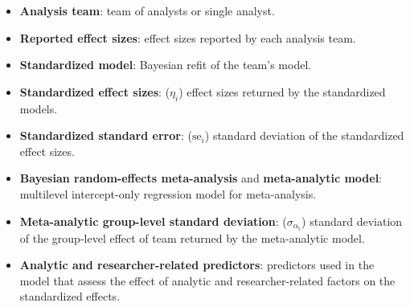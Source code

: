 \documentclass[Review,times,sageh]{sagej}
\providecommand{\tightlist}{\setlength{\itemsep}{0pt}\setlength{\parskip}{0pt}}
\begin{document}
\begin{itemize}
\tightlist
\item
  \textbf{Analysis team}: team of analysts or single analyst.
\item
  \textbf{Reported effect sizes}: effect sizes reported by each analysis team.
\item
  \textbf{Standardized model}: Bayesian refit of the team's model.
\item
  \textbf{Standardized effect sizes}: (\(\eta_i\)) effect sizes returned by the standardized models.
\item
  \textbf{Standardized standard error}: (\(\text{se}_i\)) standard deviation of the standardized effect sizes.
\item
  \textbf{Bayesian random-effects meta-analysis} and \textbf{meta-analytic model}: multilevel intercept-only regression model for meta-analysis.
\item
  \textbf{Meta-analytic group-level standard deviation}: (\(\sigma_{\alpha_{\text{t}}}\)) standard deviation of the group-level effect of team returned by the meta-analytic model.
\item
  \textbf{Analytic and researcher-related predictors}: predictors used in the model that assess the effect of analytic and researcher-related factors on the standardized effects.
\end{itemize}



\end{document}
